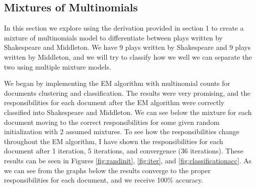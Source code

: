 \documentclass[paper=a4, fontsize=11pt]{scrartcl} %
\begin{document}
\subsection{Mixtures of Multinomials}
In this section we explore using the derivation provided in section 1 to create a mixture of multinomials model to differentiate between plays written by Shakespeare and Middleton.
We have 9 plays written by Shakespeare and 9 plays written by Middleton, and we will try to classify how we well we can separate the two using multiple mixture models.


We began by implementing the EM algorithm with multinomial counts for documents clustering and classification.  
The results were very promising, and the responsibilities for each document after the EM algorithm were correctly classified into Shakespeare and Middleton.
We can see below the mixture for each document moving to the correct responsibilities for some given random initialization with 2 assumed mixtures.  
To see how the responsibilities change throughout the EM algorithm, I have shown the responsibilities for each document after 1 iteration, 5 iterations, and convergence (36 iterations).
These results can be seen in Figures \ref{fig:randinit}, \ref{fig:iter}, and \ref{fig:classificationacc}.
As we can see from the graphs below the results converge to the proper responsibilities for each document, and we receive 100\% accuracy.
\end{document}
